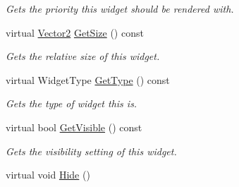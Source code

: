 \begin{DoxyCompactItemize}
\begin{DoxyCompactList}\small\item\em Gets the priority this widget should be rendered with. \item\end{DoxyCompactList}\item 
virtual \hyperlink{classMezzanine_1_1Vector2}{Vector2} \hyperlink{classMezzanine_1_1UI_1_1Widget_adb7eb8aae00798321f74d8174027d3c1}{GetSize} () const 
\begin{DoxyCompactList}\small\item\em Gets the relative size of this widget. \item\end{DoxyCompactList}\item 
virtual WidgetType \hyperlink{classMezzanine_1_1UI_1_1Widget_a9e1a01dc48630ce92e617cc0c6e9d31a}{GetType} () const 
\begin{DoxyCompactList}\small\item\em Gets the type of widget this is. \item\end{DoxyCompactList}\item 
virtual bool \hyperlink{classMezzanine_1_1UI_1_1Widget_a2f4a364179d378fded57418571cdcfd0}{GetVisible} () const 
\begin{DoxyCompactList}\small\item\em Gets the visibility setting of this widget. \item\end{DoxyCompactList}\item 
\hypertarget{classMezzanine_1_1UI_1_1Widget_ad6575e6720477274153924b316e5b1d4}{
virtual void \hyperlink{classMezzanine_1_1UI_1_1Widget_ad6575e6720477274153924b316e5b1d4}{Hide} ()}
\label{classMezzanine_1_1UI_1_1Widget_ad6575e6720477274153924b316e5b1d4}


\end{DoxyCompactItemize}
